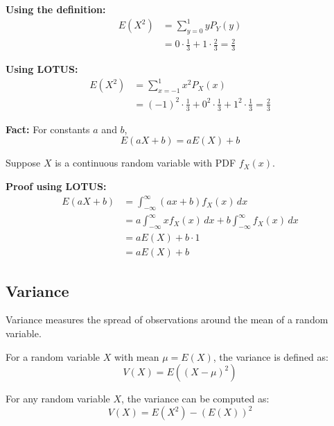 \documentclass{article}
\begin{document}
    \noindent
    \textbf{Using the definition:}
    \begin{align*}
        E(X^2) &= \sum_{y = 0}^{1} y P_Y(y) \\
               &= 0 \cdot \frac{1}{3} + 1 \cdot \frac{2}{3} = \frac{2}{3}
    \end{align*}

    \noindent
    \textbf{Using LOTUS:}
    \begin{align*}
        E(X^2) &= \sum_{x = -1}^{1} x^2 P_X(x) \\
               &= (-1)^2 \cdot \frac{1}{3} + 0^2 \cdot \frac{1}{3} + 1^2 \cdot \frac{1}{3} = \frac{2}{3}
    \end{align*}

    \vspace{1em}
    \noindent
    \textbf{Fact:} For constants $a$ and $b$,
    \[
        E(aX + b) = aE(X) + b
    \]

    \vspace{0.5em}
    \noindent
    Suppose $X$ is a continuous random variable with PDF $f_X(x)$.

    \vspace{0.5em}
    \noindent
    \textbf{Proof using LOTUS:}
    \begin{align*}
        E(aX + b) &= \int_{-\infty}^{\infty} (ax + b)f_X(x)\,dx \\
                  &= a\int_{-\infty}^{\infty} xf_X(x)\,dx + b\int_{-\infty}^{\infty} f_X(x)\,dx \\
                  &= aE(X) + b \cdot 1 \\
                  &= aE(X) + b
    \end{align*}




    \subsection*{Variance}

    Variance measures the spread of observations around the mean of a random variable.

    For a random variable $X$ with mean $\mu = E(X)$, the variance is defined as:
    \[
    V(X) = E((X - \mu)^2)
    \]

    For any random variable $X$, the variance can be computed as:
    \[
    V(X) = E(X^2) - (E(X))^2
    \]
\end{document}
